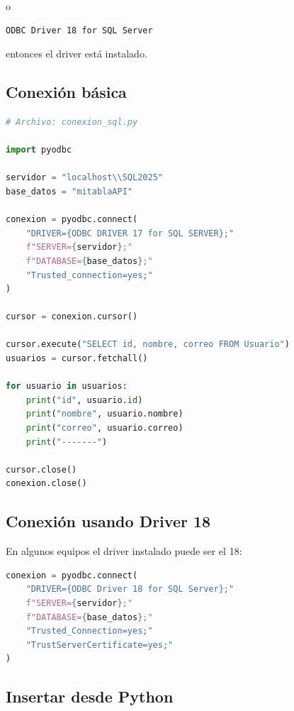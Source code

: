\documentclass[12pt]{article}
\begin{document}
o

\begin{lstlisting}
ODBC Driver 18 for SQL Server
\end{lstlisting}

entonces el driver está instalado.

\subsection{Conexión básica}

\begin{lstlisting}[language=Python]
# Archivo: conexion_sql.py

import pyodbc

servidor = "localhost\\SQL2025"
base_datos = "mitablaAPI"

conexion = pyodbc.connect(
    "DRIVER={ODBC DRIVER 17 for SQL SERVER};"
    f"SERVER={servidor};"
    f"DATABASE={base_datos};"
    "Trusted_connection=yes;"
)

cursor = conexion.cursor()

cursor.execute("SELECT id, nombre, correo FROM Usuario")
usuarios = cursor.fetchall()

for usuario in usuarios:
    print("id", usuario.id)
    print("nombre", usuario.nombre)
    print("correo", usuario.correo)
    print("-------")

cursor.close()
conexion.close()
\end{lstlisting}

\subsection{Conexión usando Driver 18}

En algunos equipos el driver instalado puede ser el 18:

\begin{lstlisting}[language=Python]
conexion = pyodbc.connect(
    "DRIVER={ODBC Driver 18 for SQL Server};"
    f"SERVER={servidor};"
    f"DATABASE={base_datos};"
    "Trusted_Connection=yes;"
    "TrustServerCertificate=yes;"
)
\end{lstlisting}

\subsection{Insertar desde Python}
\end{document}
